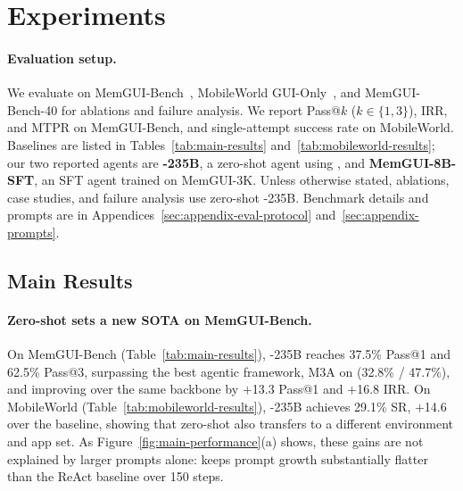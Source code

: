 
\section{Experiments}
\label{sec:experiments}
\setcounter{insight}{0}
\vspace{-0.25em}

\paragraph{Evaluation setup.}
We evaluate on MemGUI-Bench~\cite{liu2026memgui}, MobileWorld GUI-Only~\cite{kong2025mobileworld}, and MemGUI-Bench-40 for ablations and failure analysis. We report Pass@$k$ ($k{\in}\{1,3\}$), IRR, and MTPR on MemGUI-Bench, and single-attempt success rate on MobileWorld. Baselines are listed in Tables~\ref{tab:main-results} and~\ref{tab:mobileworld-results}; our two reported agents are \textbf{\ourmethod-235B}, a zero-shot \conact agent using , and \textbf{MemGUI-8B-SFT}, an SFT  agent trained on MemGUI-3K. Unless otherwise stated, ablations, case studies, and failure analysis use zero-shot \ourmethod-235B. Benchmark details and prompts are in Appendices~\ref{sec:appendix-eval-protocol} and~\ref{sec:appendix-prompts}.

\subsection{Main Results}
\label{sec:main-results}
\vspace{-0.25em}

\paragraph{Zero-shot \conact sets a new SOTA on MemGUI-Bench.}
On MemGUI-Bench (Table~\ref{tab:main-results}), \ourmethod-235B reaches 37.5\% Pass@1 and 62.5\% Pass@3, surpassing the best agentic framework, M3A on  (32.8\% / 47.7\%), and improving over the same backbone by $+$13.3 Pass@1 and $+$16.8 IRR. On MobileWorld (Table~\ref{tab:mobileworld-results}), \ourmethod-235B achieves 29.1\% SR, $+$14.6 over the  baseline, showing that zero-shot \conact also transfers to a different environment and app set. As Figure~\ref{fig:main-performance}(a) shows, these gains are not explained by larger prompts alone: \conact keeps prompt growth substantially flatter than the ReAct baseline over 150 steps.

